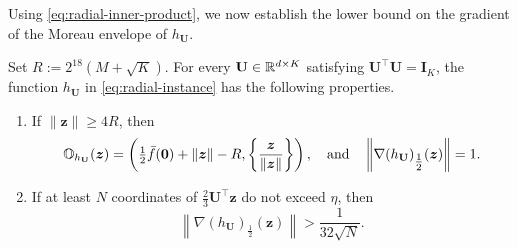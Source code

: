 Using \eqref{eq:radial-inner-product}, we now establish
the lower bound on the gradient of the Moreau envelope
of $h_{\mathbf U}$.
\begin{lemma}
\label{lem:radial-stationarity}
Set $R:=2^{18}(M+\sqrt K)$.
For  every
$\mathbf U\in{\mathbb{R}}^{d\times K}$ satisfying
$\mathbf U^\top\mathbf U=\mathbf I_K$, the function
$h_{\mathbf U}$ in \eqref{eq:radial-instance}
has the following properties.
\begin{enumerate}[label=(\roman*)]
 \item If $\|\bm z\|\ge4R$, then
 \[
  \mathbb O_{h_{\mathbf U}}(\bm z)
  =\left(
   \tfrac12\bar f({\mathbf 0})+\|\bm z\|-R,
   \left\{\frac{\bm z}{\|\bm z\|}\right\}
  \right), \quad \text{and} \quad \left\|\nabla(h_{\mathbf U})_{\tfrac12}(\bm z )\right\|=1.
 \]
 \item If at least $N$ coordinates of
 $\tfrac23\mathbf U^\top\bm z$ do not exceed $\eta$, then
 \[
  \left\|\nabla(h_{\mathbf U})_{\tfrac12}(\bm z)\right\|
  >\frac1{32\sqrt N}.
 \]
\end{enumerate}
\end{lemma}
